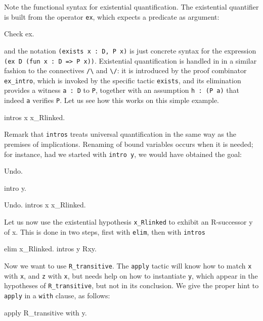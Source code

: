 \documentclass[11pt,a4paper]{book}
\begin{document}
Note the functional syntax for existential quantification. The existential
quantifier is built from the operator \verb:ex:, which expects a 
predicate as argument:
\begin{coq_example}
Check ex.
\end{coq_example}
and the notation \verb+(exists x : D, P x)+ is just concrete syntax for 
the expression \verb+(ex D (fun x : D => P x))+. 
Existential quantification is handled in \Coq{} in a similar
fashion to the connectives \verb:/\: and \verb:\/:: it is introduced by
the proof combinator \verb:ex_intro:, which is invoked by the specific 
tactic \verb:exists:, and its elimination provides a witness \verb+a : D+ to
\verb:P:, together with an assumption \verb+h : (P a)+ that indeed \verb+a+
verifies \verb:P:. Let us see how this works on this simple example.
\begin{coq_example}
intros x x_Rlinked.
\end{coq_example}

Remark that \verb:intros: treats universal quantification in the same way
as the premises of implications. Renaming of bound variables occurs
when it is needed; for instance, had we started with \verb:intro y:,
we would have obtained the goal:
\begin{coq_eval}
Undo.
\end{coq_eval}
\begin{coq_example}
intro y.
\end{coq_example}
\begin{coq_eval}
Undo.
intros x x_Rlinked.
\end{coq_eval}

Let us now use the existential hypothesis \verb:x_Rlinked: to 
exhibit an R-successor y of x. This is done in two steps, first with
\verb:elim:, then with \verb:intros:

\begin{coq_example}
elim x_Rlinked.
intros y Rxy.
\end{coq_example}

Now we want to use \verb:R_transitive:. The \verb:apply: tactic will know
how to match \verb:x: with \verb:x:, and \verb:z: with \verb:x:, but needs
help on how to instantiate \verb:y:, which appear in the hypotheses of
\verb:R_transitive:, but not in its conclusion. We give the proper hint
to \verb:apply: in a \verb:with: clause, as follows:
\begin{coq_example}
apply R_transitive with y.
\end{coq_example}
\end{document}
